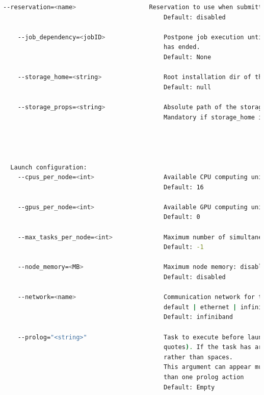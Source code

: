 \begin{lstlisting}[language=bash]
    --reservation=<name>                    Reservation to use when submitting the job. 
                                            Default: disabled
                                            
    --job_dependency=<jobID>                Postpone job execution until the job dependency 
                                            has ended.
                                            Default: None
                                            
    --storage_home=<string>                 Root installation dir of the storage implementation
                                            Default: null
                                            
    --storage_props=<string>                Absolute path of the storage properties file
                                            Mandatory if storage_home is defined

                                            
                                            
                                            
  Launch configuration:
    --cpus_per_node=<int>                   Available CPU computing units on each node
                                            Default: 16
                                            
    --gpus_per_node=<int>                   Available GPU computing units on each node
                                            Default: 0
                                            
    --max_tasks_per_node=<int>              Maximum number of simultaneous tasks running on a node
                                            Default: -1
                                            
    --node_memory=<MB>                      Maximum node memory: disabled | <int> (MB)
                                            Default: disabled
                                            
    --network=<name>                        Communication network for transfers: 
                                            default | ethernet | infiniband | data.
                                            Default: infiniband
                                              
    --prolog="<string>"                     Task to execute before launching COMPSs (Notice the
                                            quotes). If the task has arguments split them by ","
                                            rather than spaces. 
                                            This argument can appear multiple times for more 
                                            than one prolog action
                                            Default: Empty
                                            

\end{lstlisting}
